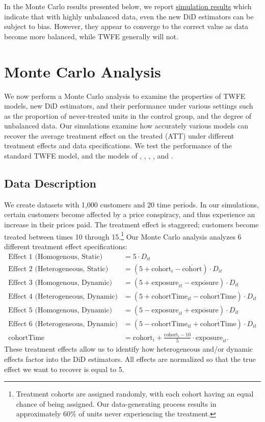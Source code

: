 \documentclass[12pt]{article}
\begin{document}
In the Monte Carlo results presented below, we report \hyperref[fig:estimators-balanced]{simulation results} which indicate that with highly unbalanced data, even the new DiD estimators can be subject to bias. However, they appear to converge to the correct value as data become more balanced, while TWFE generally will not.

\section{Monte Carlo Analysis} \label{sec:analysis}
We now perform a Monte Carlo analysis to examine the properties of TWFE models, new DiD estimators, and their performance under various settings such as the proportion of never-treated units in the control group, and the degree of unbalanced data. Our simulations examine how accurately various models can recover the average treatment effect on the treated (ATT) under different treatment effects and data specifications. We test the performance of the standard TWFE model, and the models of \citet{sunabr2021a}, \citet{wooldridge2021two}, \citet{borusyak2024revisiting}, \citet{gardner2022a}, and \citet{CS2021}.
\subsection{Data Description}
We create datasets with 1,000 customers and 20 time periods. In our simulations, certain customers become affected by a price conspiracy, and thus experience an increase in their prices paid. The treatment effect is staggered; customers become treated between times 10 through 15.\footnote{Treatment cohorts are assigned randomly, with each cohort having an equal chance of being assigned. Our data-generating process results in approximately 60\% of units never experiencing the treatment.} Our Monte Carlo analysis analyzes 6 different treatment effect specifications:
\begin{align*}
    \text{Effect 1 (Homogenous, Static)} &= 5\cdot D_{it} \\
    \text{Effect 2 (Heterogeneous, Static)} &= (5 + \text{cohort}_i - \overline{\text{cohort}})\cdot D_{it} \\
    \text{Effect 3 (Homogenous, Dynamic)} &= (5 + \text{exposure}_{it} - \overline{\text{exposure}})\cdot D_{it} \\
    \text{Effect 4 (Heterogeneous, Dynamic)} &= (5 + \text{cohortTime}_{it} - \overline{\text{cohortTime}})\cdot D_{it} \\
    \text{Effect 5 (Homogenous, Dynamic)} &= (5 - \text{exposure}_{it} + \overline{\text{exposure}})\cdot D_{it} \\
    \text{Effect 6 (Heterogeneous, Dynamic)} &= (5 - \text{cohortTime}_{it} + \overline{\text{cohortTime}})\cdot D_{it} \\
    \text{cohortTime} &= \text{cohort}_i + \frac{\text{cohort}_i-10}{5}\cdot \text{exposure}_{it}.
\end{align*}
These treatment effects allow us to identify how heterogeneous and/or dynamic effects factor into the DiD estimators. All effects are normalized so that the true effect we want to recover is equal to 5.
\end{document}
